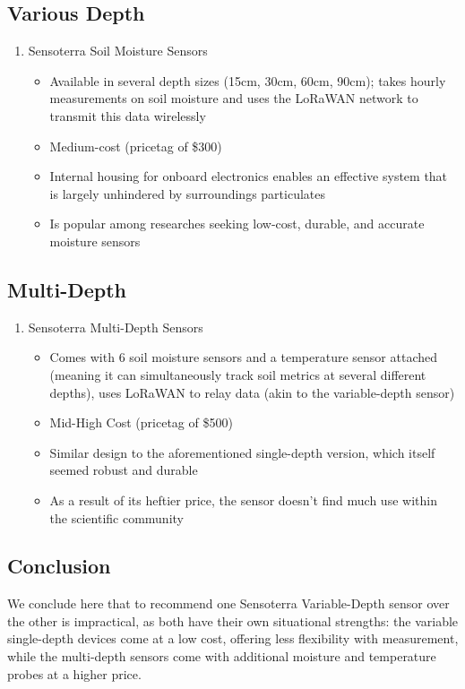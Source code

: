 \documentclass{article}
\begin{document}
\subsection{Various Depth}  
\begin{enumerate}
\item Sensoterra Soil Moisture Sensors
\begin{itemize}
    \item Available in several depth sizes (15cm, 30cm, 60cm, 90cm); takes hourly measurements on soil moisture and uses the LoRaWAN network to transmit this data wirelessly
    \item Medium-cost (pricetag of \$300)
    \item Internal housing for onboard electronics enables an effective system that is largely unhindered by surroundings particulates
    \item Is popular among researches seeking low-cost, durable, and accurate moisture sensors
\end{itemize}
\end{enumerate}

\subsection{Multi-Depth}
\begin{enumerate}
\item Sensoterra Multi-Depth Sensors
\begin{itemize}
    \item Comes with 6 soil moisture sensors and a temperature sensor attached (meaning it can simultaneously track soil metrics at several different depths), uses LoRaWAN to relay data (akin to the variable-depth sensor)
    \item Mid-High Cost (pricetag of \$500)
    \item Similar design to the aforementioned single-depth version, which itself seemed robust and durable
    \item As a result of its heftier price, the sensor doesn't find much use within the scientific community
\end{itemize}
\end{enumerate}

\subsection{Conclusion}
We conclude here that to recommend one Sensoterra Variable-Depth sensor over the other is impractical, as both have their own situational strengths: the variable single-depth devices come at a low cost, offering less flexibility with measurement, while the multi-depth sensors come with additional moisture and temperature probes at a higher price.
\end{document}
